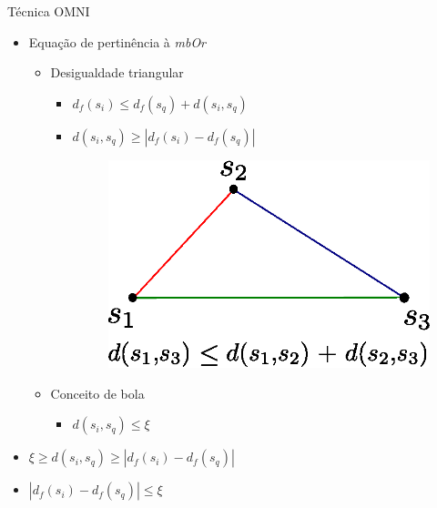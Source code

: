 \documentclass{beamer}
\begin{document}
\begin{frame}{Técnica OMNI}	
	\begin{itemize}
	 \item Equação de pertinência à \textit{mbOr}\newline
	    \begin{itemize}
	      \item Desigualdade triangular\newline
		\begin{itemize}
		  \item $d_{f}(s_i) \leq d_{f}(s_q) + d(s_i, s_q)$\newline
		  
		  \item $d(s_i, s_q) \geq |d_{f}(s_i) - d_{f}(s_q)|$\newline
		      \begin{figure}[!H]
			\vspace{-2.5cm}
			\hspace{4cm}
			\includegraphics[width=.35\textwidth]{desig_tri.eps}
		      \end{figure}
		\end{itemize}
	      \item Conceito de bola\newline
		\begin{itemize}
		  \item $d(s_i, s_q) \leq \xi$\newline
		\end{itemize}
	    \end{itemize}
	\item $\xi \geq d(s_i,s_q) \geq |d_f(s_i) - d_f(s_q)|$\newline
	\item $|d_f(s_i) - d_f(s_q)| \leq \xi$
	\end{itemize}

\end{frame}
\end{document}
